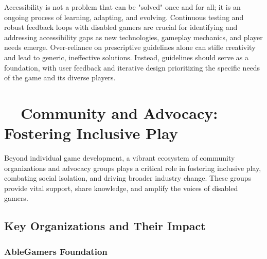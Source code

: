 Accessibility is not a problem that can be "solved" once and for all; it is an ongoing process of learning, adapting, and evolving\supercite{Wayline2025}. Continuous testing and robust feedback loops with disabled gamers are crucial for identifying and addressing accessibility gaps as new technologies, gameplay mechanics, and player needs emerge\supercite{Wayline2025}. Over-reliance on prescriptive guidelines alone can stifle creativity and lead to generic, ineffective solutions. Instead, guidelines should serve as a foundation, with user feedback and iterative design prioritizing the specific needs of the game and its diverse players\supercite{Wayline2025}.

\section{~~Community and Advocacy: Fostering Inclusive Play}

Beyond individual game development, a vibrant ecosystem of community organizations and advocacy groups plays a critical role in fostering inclusive play, combating social isolation, and driving broader industry change. These groups provide vital support, share knowledge, and amplify the voices of disabled gamers.

\subsection{Key Organizations and Their Impact}


\subsubsection{AbleGamers Foundation}

